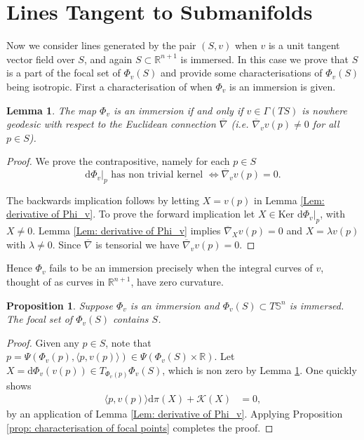 \documentclass[12pt]{amsart}
\theoremstyle{plain}
\newtheorem{Lem}{Lemma}
\newtheorem{Prop}{Proposition}
\theoremstyle{definition}
\def\R{\mathbb{R}}
\def\S{\mathbb{S}}
\newcommand{\td}{\mathrm{d}}
\numberwithin{equation}{section}
\begin{document}
\section{Lines Tangent to Submanifolds}
\label{sec: lines tangent submanifolds}
Now we consider lines generated by the pair $(S,v)$ when $v$ is a unit tangent vector field over $S$, and again $S\subset\R^{n+1}$ is immersed. In this case we prove that $S$ is a part of the focal set of $\Phi_v(S)$ and provide some characterisations of $\Phi_v(S)$ being isotropic. First a characterisation of when $\Phi_v$ is an immersion is given.
\begin{Lem}\label{lem: dphi is injective iff v is nowhere geodesic}
     The map $\Phi_v$ is an immersion if and only if $v\in\Gamma(TS)$ is nowhere geodesic with respect to the Euclidean connection $\overline\nabla$ (i.e. $\overline\nabla_{v}v(p)\neq 0$ for all $p\in S$).
\end{Lem}
\begin{proof}
    We prove the contrapositive, namely for each $p\in S$
    \[
    \td\Phi_v|_p \text{ has non trivial kernel } \iff \overline\nabla_{v}v(p)=0.
    \]

    The backwards implication follows by letting $X=v(p)$ in Lemma \ref{Lem: derivative of Phi_v}. To prove the forward implication let $X\in\mbox{Ker }\td \Phi_v|_p$, with $X\neq 0$. Lemma \ref{Lem: derivative of Phi_v} implies $\overline\nabla_Xv(p)=0$ and $X=\lambda v(p)$ with $\lambda\neq 0$. Since $\overline\nabla$ is tensorial we have $\overline\nabla_{v}v(p)=0$.
\end{proof}
Hence $\Phi_v$ fails to be an immersion precisely when the integral curves of $v$, thought of as curves in $\R^{n+1}$, have zero curvature.
\begin{Prop}\label{prop: submanfolds tangent to the lines are focal}
    Suppose $\Phi_v$ is an immersion and $\Phi_v(S)\subset T\S^n$ is immersed. The focal set of $\Phi_v(S)$ contains $S$.
\end{Prop}
\begin{proof}
     Given any $p\in S$, note that $p=\Psi(\Phi_v(p),\langle p,v(p)\rangle)\in \Psi(\Phi_v(S)\times \mathbb{R})$. Let $X=\td\Phi_v(v(p))\in T_{\Phi_v(p)}\Phi_v(S)$, which is non zero by Lemma \ref{lem: dphi is injective iff v is nowhere geodesic}. One quickly shows
     \begin{align*}
     \langle p,v(p)\rangle \td\pi(X)+\mathcal{K}(X)&=0,
     \end{align*}
     by an application of Lemma \ref{Lem: derivative of Phi_v}. Applying Proposition \ref{prop: characterisation of focal points} completes the proof.
\end{proof}
\end{document}

